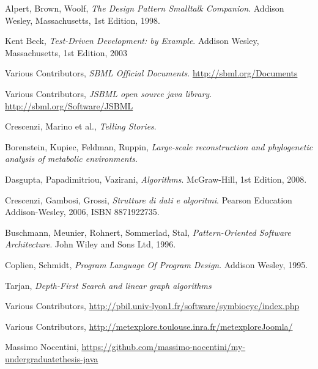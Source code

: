 \begin{thebibliography}{99}

  Alpert, Brown, Woolf,
  \emph{The Design Pattern Smalltalk Companion}.
  Addison Wesley, Massachusetts,
  1st Edition,
  1998.

  Kent Beck,
  \emph{Test-Driven Development: by Example}.
  Addison Wesley, Massachusetts,
  1st Edition,
  2003

  Various Contributors,
  \emph{SBML Official Documents}.
  \url{http://sbml.org/Documents}

 Various Contributors, \emph{JSBML open
    source java library}. \url{http://sbml.org/Software/JSBML}

  Crescenzi, Marino et al.,
  \emph{Telling Stories}.

 Borenstein, Kupiec, Feldman,
  Ruppin, \emph{Large-scale reconstruction and phylogenetic analysis
    of metabolic environments}.

  Dasgupta, Papadimitriou, Vazirani,
  \emph{Algorithms}.
  McGraw-Hill,
  1st Edition,
  2008.

  Crescenzi, Gambosi, Grossi,
  \emph{Strutture di dati e algoritmi}.
  Pearson Education Addison-Wesley, 2006, ISBN 8871922735.

  Buschmann, Meunier, Rohnert, Sommerlad, Stal, 
  \emph{Pattern-Oriented Software Architecture}.
  John Wiley and Sons Ltd, 1996.

  Coplien, Schmidt,
  \emph{Program Language Of Program Design}.
  Addison Wesley, 1995.

  Tarjan,
  \emph{Depth-First Search and linear graph algorithms}

 Various Contributors,
  \url{http://pbil.univ-lyon1.fr/software/symbiocyc/index.php}

 Various Contributors,
  \url{http://metexplore.toulouse.inra.fr/metexploreJoomla/}

 Massimo Nocentini,
  \url{https://github.com/massimo-nocentini/my-undergraduatethesis-java}

\end{thebibliography}